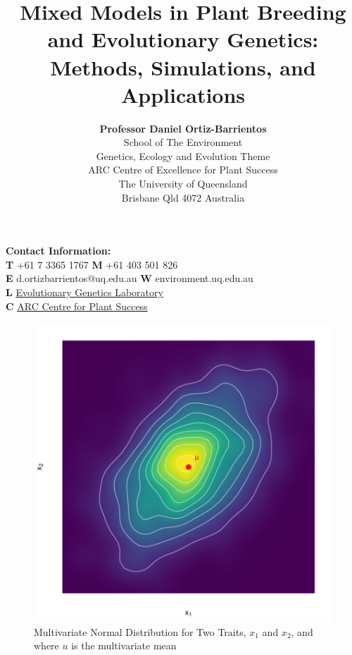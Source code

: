 \documentclass[12pt,a4paper]{article}
\title{\textcolor{uqpurple}{Mixed Models in Plant Breeding \\and Evolutionary Genetics: \\ Methods, Simulations, and Applications}}
\author{
    \textbf{Professor Daniel Ortiz-Barrientos}\\
    \small School of The Environment\\
    \small Genetics, Ecology and Evolution Theme\\
    \small ARC Centre of Excellence for Plant Success\\
    \small The University of Queensland\\
    \small Brisbane Qld 4072 Australia
}
\date{}
\begin{document}
\maketitle

\vspace{1em}
\noindent\textbf{Contact Information:}\\
\textbf{T} +61 7 3365 1767 \textbf{M} +61 403 501 826\\
\textbf{E} d.ortizbarrientos@uq.edu.au \textbf{W} environment.uq.edu.au\\
\textbf{L} \href{http://www.ortizbarrientoslab.org}{Evolutionary Genetics Laboratory}\\
\textbf{C} \href{http://plantsuccess.org}{ARC Centre for Plant Success}


\begin{figure}[H] %
    \centering
    \includegraphics[width=1\textwidth]{multivariate_normal_2d.pdf} %
    \caption{Multivariate Normal Distribution for Two Traits, $x_1$ and $x_2$, and where $u$ is the multivariate mean}
    \label{fig:Multivariate NOrmal 2D} %
\end{figure}
\newpage
\end{document}
